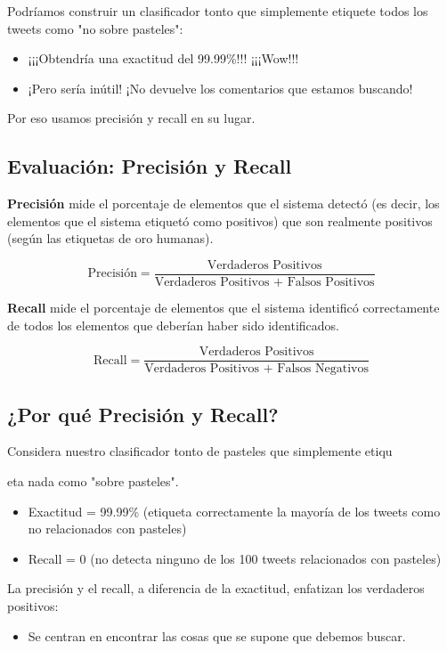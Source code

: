 \documentclass[11pt,fleqn]{book} %
\begin{document}
Podríamos construir un clasificador tonto que simplemente etiquete todos los tweets como "no sobre pasteles":
\begin{itemize}
\item ¡¡¡Obtendría una exactitud del 99.99\%!!! ¡¡¡Wow!!!
\item ¡Pero sería inútil! ¡No devuelve los comentarios que estamos buscando!
\end{itemize}

Por eso usamos precisión y recall en su lugar.

\subsection{Evaluación: Precisión y Recall}
\textbf{Precisión} mide el porcentaje de elementos que el sistema detectó (es decir, los elementos que el sistema etiquetó como positivos) que son realmente positivos (según las etiquetas de oro humanas).

\[
\text{Precisión} = \frac{\text{Verdaderos Positivos}}{\text{Verdaderos Positivos + Falsos Positivos}}
\]

\textbf{Recall} mide el porcentaje de elementos que el sistema identificó correctamente de todos los elementos que deberían haber sido identificados.

\[
\text{Recall} = \frac{\text{Verdaderos Positivos}}{\text{Verdaderos Positivos + Falsos Negativos}}
\]

\subsection{¿Por qué Precisión y Recall?}
Considera nuestro clasificador tonto de pasteles que simplemente etiqu

eta nada como "sobre pasteles".

\begin{itemize}
  \item Exactitud = 99.99\% (etiqueta correctamente la mayoría de los tweets como no relacionados con pasteles)
  \item Recall = 0 (no detecta ninguno de los 100 tweets relacionados con pasteles)
\end{itemize}

La precisión y el recall, a diferencia de la exactitud, enfatizan los verdaderos positivos:
\begin{itemize}
  \item Se centran en encontrar las cosas que se supone que debemos buscar.
\end{itemize}
\end{document}
